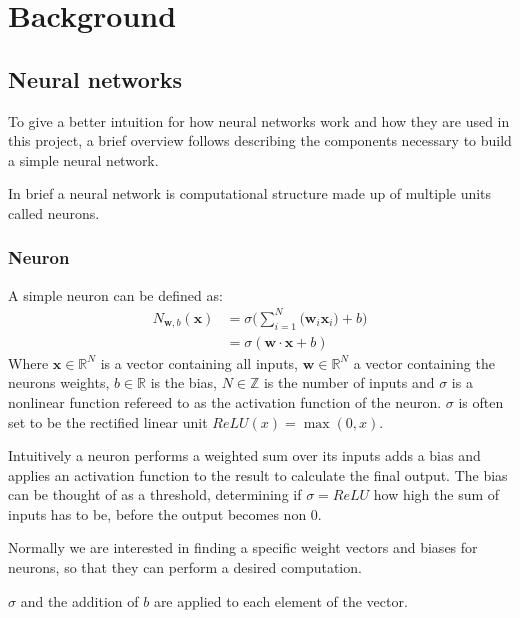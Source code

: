
\newcommand{\neuronSum}[1][N]{
	\sigma\Bigg(\sum_{i=1}^{#1}{\Big(\boldsymbol{w}_i \boldsymbol{x}_i\Big)} + b\Bigg)
}

\chapter{Background}
\section{Neural networks}
To give a better intuition for how neural networks work and how they are used in this project, a brief overview follows describing the components necessary to build a simple neural network.

In brief a neural network is computational structure made up of multiple units called neurons.

\subsection{Neuron}
A simple neuron can be defined as:
\begin{equation}
\begin{split}
	N_{\boldsymbol w, b}(\boldsymbol{x}) & = \neuronSum \\
 	& = \sigma (\boldsymbol{w} \cdot \boldsymbol{x} + b)
\end{split}
\end{equation}
Where $\boldsymbol{x} \in \mathbb{R}^N$ is a vector containing all inputs, $ \boldsymbol{w} \in \mathbb{R}^N$ a vector containing the neurons weights, $b \in \mathbb{R}$ is the bias, $N \in \mathbb{Z}$ is the number of inputs and $\sigma$ is a nonlinear function refereed to as the activation function of the neuron. $\sigma$ is often set to be the rectified linear unit $ReLU(x) = \max(0, x)$.

Intuitively a neuron performs a weighted sum over its inputs adds a bias and applies an activation function to the result to calculate the final output. The bias can be thought of as a threshold, determining if $\sigma = ReLU$ how high the sum of inputs has to be, before the output becomes non 0.

Normally we are interested in finding a specific weight vectors and biases for neurons, so that they can perform a desired computation.

$\sigma$ and the addition of $b$ are applied to each element of the vector.


